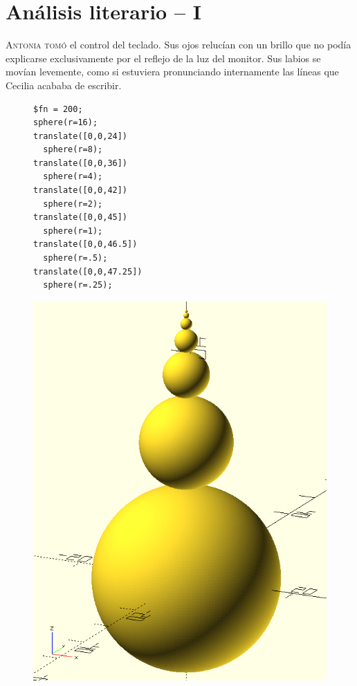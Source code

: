 \chapter{Análisis literario -- I}

\lettrine[lines=2,slope=.5em]{A}{ntonia tomó} el control del
teclado. Sus ojos relucían con un brillo que no podía explicarse
exclusivamente por el reflejo de la luz del monitor. Sus labios se
movían levemente, como si estuviera pronunciando internamente las
líneas que Cecilia acababa de escribir.

\begin{figure}[ht]
  \begin{minipage}[]{.5\textwidth}
    \begin{lstlisting}
$fn = 200;      
sphere(r=16);
translate([0,0,24])
  sphere(r=8);
translate([0,0,36])
  sphere(r=4);
translate([0,0,42])
  sphere(r=2);
translate([0,0,45])
  sphere(r=1);
translate([0,0,46.5])
  sphere(r=.5);
translate([0,0,47.25])
  sphere(r=.25);       
    \end{lstlisting}%
  \end{minipage}\hfill
   \begin{minipage}[]{.5\textwidth}
     \centering
     \includegraphics[width=.8\textwidth]{imagenes/esferas}
   \end{minipage}
  \label{fig:esferas-seis}
\end{figure}



